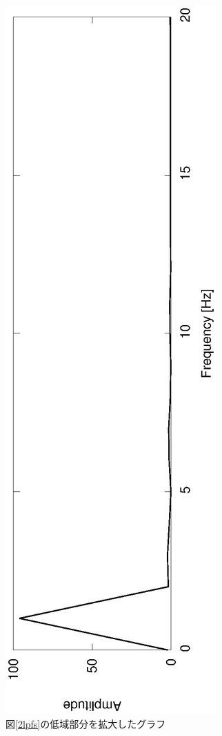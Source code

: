 \documentclass[a4j]{jsarticle}
\begin{document}
\begin{figure}[H]
 \centering
 \vspace{-4cm}
 \hspace{-2cm}
 \includegraphics[angle=-90,scale=0.6]{2ndout_LPF_spec_kakudai.eps}
  \vspace{-2cm}
 \caption{図\ref{2lpfs}の低域部分を拡大したグラフ}
 \label{2lpfsk}
\end{figure}
\vspace{-5mm}
\end{document}
